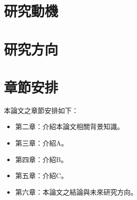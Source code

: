 \section{研究動機}
\section{研究方向}
\section{章節安排}
本論文之章節安排如下：

\begin{itemize}
\itemsep -2pt %
  \item  第二章：介紹本論文相關背景知識。
  \item  第三章：介紹A。
  \item  第四章：介紹B。
  \item  第五章：介紹C。
  \item  第六章：本論文之結論與未來研究方向。
\end{itemize}


